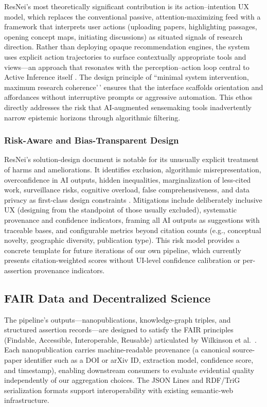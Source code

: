 \documentclass[
  english,
]{article}
\begin{document}
ResNei's most theoretically significant contribution is its
action--intention UX model, which replaces the conventional passive,
attention-maximizing feed with a framework that interprets user actions
(uploading papers, highlighting passages, opening concept maps,
initiating discussions) as situated signals of research direction.
Rather than deploying opaque recommendation engines, the system uses
explicit action trajectories to surface contextually appropriate tools
and views---an approach that resonates with the perception--action loop
central to Active Inference itself \citep{parr2022active}. The design
principle of ``minimal system intervention, maximum research
coherence'\,' ensures that the interface scaffolds orientation and
affordances without interruptive prompts or aggressive automation. This
ethos directly addresses the risk that AI-augmented sensemaking tools
inadvertently narrow epistemic horizons through algorithmic filtering.

\subsubsection{Risk-Aware and Bias-Transparent
Design}\label{risk-aware-and-bias-transparent-design}

ResNei's solution-design document is notable for its unusually explicit
treatment of harms and ameliorations. It identifies exclusion,
algorithmic misrepresentation, overconfidence in AI outputs, hidden
inequalities, marginalization of less-cited work, surveillance risks,
cognitive overload, false comprehensiveness, and data privacy as
first-class design constraints \citep{lumiruusu2025resnei}. Mitigations
include deliberately inclusive UX (designing from the standpoint of
those usually excluded), systematic provenance and confidence
indicators, framing all AI outputs as suggestions with traceable bases,
and configurable metrics beyond citation counts (e.g., conceptual
novelty, geographic diversity, publication type). This risk model
provides a concrete template for future iterations of our own pipeline,
which currently presents citation-weighted scores without UI-level
confidence calibration or per-assertion provenance indicators.

\subsection{FAIR Data and Decentralized
Science}\label{fair-data-and-decentralized-science}

The pipeline's outputs---nanopublications, knowledge-graph triples, and
structured assertion records---are designed to satisfy the FAIR
principles (Findable, Accessible, Interoperable, Reusable) articulated
by Wilkinson et al.~\citep{wilkinson2016fair}. Each nanopublication
carries machine-readable provenance (a canonical source-paper identifier
such as a DOI or arXiv ID, extraction model, confidence score, and
timestamp), enabling downstream consumers to evaluate evidential quality
independently of our aggregation choices. The JSON Lines and RDF/TriG
serialization formats support interoperability with existing
semantic-web infrastructure.
\end{document}
